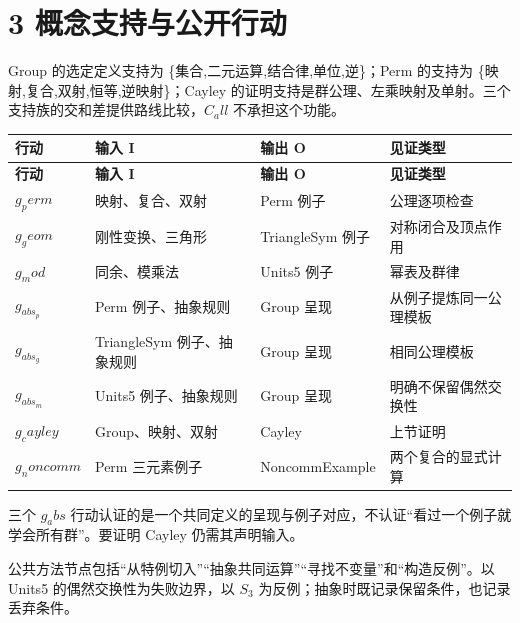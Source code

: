 \documentclass[UTF8,a4paper,zihao=-4,fontset=windows,openany]{ctexbook}
\def\mathrm#1{#1}%
\begin{document}
\section{3 概念支持与公开行动}
Group 的选定定义支持为 \{集合,二元运算,结合律,单位,逆\}；Perm 的支持为 \{映射,复合,双射,恒等,逆映射\}；Cayley 的证明支持是群公理、左乘映射及单射。三个支持族的交和差提供路线比较，\(C_\mathrm{all}\) 不承担这个功能。

\begingroup\small\setlength{\tabcolsep}{4pt}
\begin{longtable}{>{\raggedright\arraybackslash}p{}>{\raggedright\arraybackslash}p{}>{\raggedright\arraybackslash}p{}>{\raggedright\arraybackslash}p{}}
\toprule
\textbf{行动} & \textbf{输入 I} & \textbf{输出 O} & \textbf{见证类型} \\
\midrule
\endfirsthead
\toprule
\textbf{行动} & \textbf{输入 I} & \textbf{输出 O} & \textbf{见证类型} \\
\midrule
\endhead
\bottomrule
\endfoot
\bottomrule
\endlastfoot
\(g_\mathrm{perm}\) & 映射、复合、双射 & Perm 例子 & 公理逐项检查 \\
\(g_\mathrm{geom}\) & 刚性变换、三角形 & TriangleSym 例子 & 对称闭合及顶点作用 \\
\(g_\mathrm{mod}\) & 同余、模乘法 & Units5 例子 & 幂表及群律 \\
\(g_{\mathrm{abs}_p}\) & Perm 例子、抽象规则 & Group 呈现 & 从例子提炼同一公理模板 \\
\(g_{\mathrm{abs}_g}\) & TriangleSym 例子、抽象规则 & Group 呈现 & 相同公理模板 \\
\(g_{\mathrm{abs}_m}\) & Units5 例子、抽象规则 & Group 呈现 & 明确不保留偶然交换性 \\
\(g_\mathrm{cayley}\) & Group、映射、双射 & Cayley & 上节证明 \\
\(g_\mathrm{noncomm}\) & Perm 三元素例子 & NoncommExample & 两个复合的显式计算 \\
\end{longtable}
\endgroup

三个 \(g_\mathrm{abs}\) 行动认证的是一个共同定义的呈现与例子对应，不认证“看过一个例子就学会所有群”。要证明 Cayley 仍需其声明输入。

公共方法节点包括“从特例切入”“抽象共同运算”“寻找不变量”和“构造反例”。以 Units5 的偶然交换性为失败边界，以 \(S_{3}\) 为反例；抽象时既记录保留条件，也记录丢弃条件。
\end{document}
